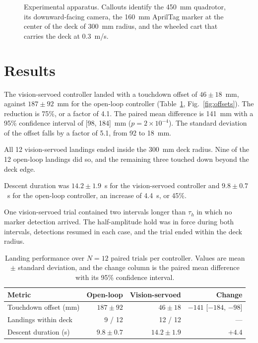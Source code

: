 \begin{figure}[!t]
\centering
\caption{Experimental apparatus. Callouts identify the 450~mm quadrotor, its
downward-facing camera, the 160~mm AprilTag marker at the center of the deck of 300~mm
radius, and the wheeled cart that carries the deck at 0.3~m/s.}
\label{fig:setup}
\end{figure}

\section{Results}
\label{sec:results}

The vision-servoed controller landed with a touchdown offset of $46 \pm 18$~mm, against
$187 \pm 92$~mm for the open-loop controller (Table~\ref{tab:results},
Fig.~\ref{fig:offsets}). The reduction is 75\%, or a factor of 4.1. The paired mean
difference is 141~mm with a 95\% confidence interval of [98, 184]~mm
($p = 2 \times 10^{-4}$). The standard deviation of the offset falls by a factor of 5.1,
from 92 to 18~mm.

All 12 vision-servoed landings ended inside the 300~mm deck radius. Nine of the 12
open-loop landings did so, and the remaining three touched down beyond the deck edge.

Descent duration was $14.2 \pm 1.9$~s for the vision-servoed controller and
$9.8 \pm 0.7$~s for the open-loop controller, an increase of 4.4~s, or 45\%.

One vision-servoed trial contained two intervals longer than $\tau_{h}$ in which no marker
detection arrived. The half-amplitude hold was in force during both intervals, detections
resumed in each case, and the trial ended within the deck radius.

\begin{table}[!t]
\caption{Landing performance over $N = 12$ paired trials per controller. Values are mean
$\pm$ standard deviation, and the change column is the paired mean difference with its
95\% confidence interval.}
\label{tab:results}
\centering
\footnotesize
\setlength{\tabcolsep}{3pt}
\begin{tabular}{lrrr}
\toprule
Metric & Open-loop & Vision-servoed & Change \\
\midrule
Touchdown offset (mm) & $187 \pm 92$  & $46 \pm 18$    & $-141$ [$-184$, $-98$] \\
Landings within deck  & 9 / 12        & 12 / 12        & --- \\
Descent duration (s)  & $9.8 \pm 0.7$ & $14.2 \pm 1.9$ & $+4.4$ \\
\bottomrule
\end{tabular}
\end{table}

